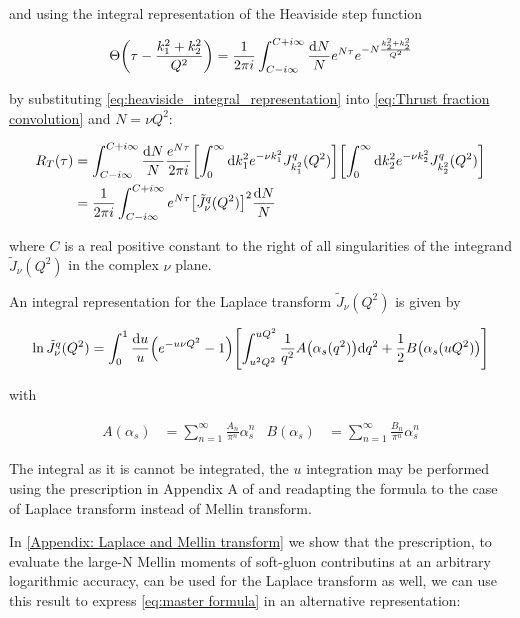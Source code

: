 \documentclass[../main.tex]{subfiles}
\begin{document}
and using the integral representation of the Heaviside step function

\begin{equation} \label{eq:heaviside_integral_representation}
    \Theta\qty(\tau - \frac{k_1^2+k_2^2}{Q^2}) = \frac{1}{2\pi i} \int_{C-i\infty}^{C+i\infty} \frac{\dd N}{N} e^{N \tau} e^{- N \frac{k_2^2+k_2^2}{Q^2}} 
\end{equation}

by substituting \cref{eq:heaviside_integral_representation} into \cref{eq:Thrust fraction convolution} and $N= \nu Q^2$:

\begin{align}
    \begin{split} \label{eq:Thrust fraction}
    R_T(\tau) &= \int_{C - i \infty}^{C + i\infty} \frac{\dd N}{N} \frac{e^{N \tau}}{2\pi i} \qty[\int_0^\infty \dd k_1^2 e^{-\nu k_1^2} J^q_{k_1^2}(Q^2) ] \qty[\int_0^\infty \dd k_2^2 e^{-\nu k_2^2} J^q_{k_2^2}(Q^2)]\\
    &=\frac{1}{2\pi i}\int_{C - i \infty}^{C + i\infty} e^{N \tau} \qty[\tilde{J}_\nu^q(Q^2)]^2 \frac{\dd N}{N}
    \end{split}
\end{align}

where $C$ is a real positive constant to the right of all singularities of the integrand $\tilde{J}_\nu(Q^2)$ in the complex $\nu$ plane. 

An integral representation for the Laplace transform $\tilde{J}_\nu(Q^2)$ is given by

\begin{equation}\label{eq:master formula}
    \ln \tilde{J}_\nu^q(Q^2) = \int_0^1 \frac{\dd u}{u} \qty(e^{-u \nu Q^2}-1)\qty[ \int_{u^2 Q^2}^{u Q^2} \frac{1}{q^2} A\qty(\alpha_s(q^2)) \dd q^2 + \frac{1}{2} B\qty(\alpha_s(u Q^2))]
\end{equation}

with 

\begin{align*}
    A(\alpha_s) &= \sum_{n=1}^\infty \frac{A_n}{\pi^n}\alpha_s^n & B(\alpha_s) &= \sum_{n=1}^\infty \frac{B_n}{\pi^n}\alpha_s^n
\end{align*}

The integral as it is cannot be integrated, the $u$ integration may be performed using the prescription in Appendix A of \cite{Catani_2003_appendix} and
readapting the formula to the case of Laplace transform instead of Mellin transform.

In \cref{Appendix: Laplace and Mellin transform} we show that the prescription, to evaluate the large-N Mellin moments of soft-gluon
contributins at an arbitrary logarithmic accuracy, can be used for the Laplace transform as well, we can use this result to express \cref{eq:master formula} 
in an alternative representation:
\end{document}
